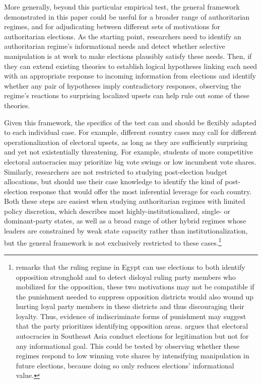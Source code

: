 \documentclass[12pt]{article}
\newcommand\fnote[1]{\footnote{\baselineskip=2\normalbaselineskip#1}}
\newcommand{\1}{\mathbbm{1}}
\begin{document}
More generally, beyond this particular empirical test, the general framework demonstrated in this paper could be useful for a broader range of authoritarian regimes, and for adjudicating between different sets of motivations for authoritarian elections. As the starting point, researchers need to identify an authoritarian regime's informational needs and detect whether selective manipulation is at work to make elections plausibly satisfy these needs. Then, if they can extend existing theories to establish logical hypotheses linking each need with an appropriate response to incoming information from elections and identify whether any pair of hypotheses imply contradictory responses, observing the regime's reactions to surprising localized upsets can help rule out some of these theories. 

Given this framework, the specifics of the test can and should be flexibly adapted to each individual case. For example, different country cases may call for different operationalization of electoral upsets, as long as they are sufficiently surprising and yet not existentially threatening. For example, students of more competitive electoral autocracies may prioritize big vote swings or low incumbent vote shares. Similarly, researchers are not restricted to studying post-election budget allocations, but should use their case knowledge to identify the kind of post-election response that would offer the most inferential leverage for each country. Both these steps are easiest when studying authoritarian regimes with limited policy discretion, which describes most highly-institutionalized, single- or dominant-party states, as well as a broad range of other hybrid regimes whose leaders are constrained by weak state capacity rather than institutionalization, but the general framework is not exclusively restricted to these cases.\fnote{\citet{Blaydes2010} remarks that the ruling regime in Egypt can use elections to both identify opposition stronghold and to detect disloyal ruling party members who mobilized for the opposition, these two motivations may not be compatible if the punishment needed to suppress opposition districts would also wound up hurting loyal party members in these districts and thus discouraging their loyalty. Thus, evidence of indiscriminate forms of punishment may suggest that the party prioritizes identifying opposition areas. \citet{Morgenbesser2016} argues that electoral autocracies in Southeast Asia conduct elections for legitimation but not for any informational goal. This could be tested by observing whether these regimes respond to low winning vote shares by intensifying manipulation in future elections, because doing so only reduces elections' informational value.}
\end{document}
